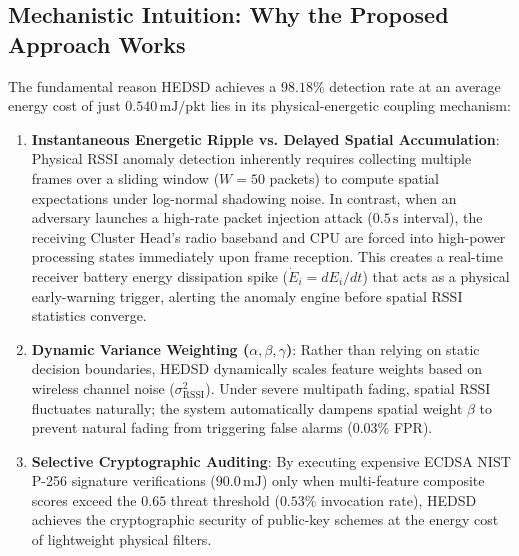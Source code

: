 \documentclass[conference]{IEEEtran}
\begin{document}
\begin{enumerate}
\subsection{Mechanistic Intuition: Why the Proposed Approach Works}
The fundamental reason HEDSD achieves a $98.18\%$ detection rate at an average energy cost of just $0.540\,\text{mJ/pkt}$ lies in its physical-energetic coupling mechanism:
\begin{enumerate}
    \item \textbf{Instantaneous Energetic Ripple vs. Delayed Spatial Accumulation}: Physical RSSI anomaly detection inherently requires collecting multiple frames over a sliding window ($W=50$ packets) to compute spatial expectations under log-normal shadowing noise. In contrast, when an adversary launches a high-rate packet injection attack ($0.5\,\text{s}$ interval), the receiving Cluster Head's radio baseband and CPU are forced into high-power processing states immediately upon frame reception. This creates a real-time receiver battery energy dissipation spike ($\dot{E}_i = dE_i/dt$) that acts as a physical early-warning trigger, alerting the anomaly engine before spatial RSSI statistics converge.
    \item \textbf{Dynamic Variance Weighting ($\alpha, \beta, \gamma$)}: Rather than relying on static decision boundaries, HEDSD dynamically scales feature weights based on wireless channel noise ($\sigma_{\text{RSSI}}^2$). Under severe multipath fading, spatial RSSI fluctuates naturally; the system automatically dampens spatial weight $\beta$ to prevent natural fading from triggering false alarms ($0.03\%$ FPR).
    \item \textbf{Selective Cryptographic Auditing}: By executing expensive ECDSA NIST P-256 signature verifications ($90.0\,\text{mJ}$) only when multi-feature composite scores exceed the $0.65$ threat threshold ($0.53\%$ invocation rate), HEDSD achieves the cryptographic security of public-key schemes at the energy cost of lightweight physical filters.
\end{enumerate}


\end{enumerate}
\end{document}

